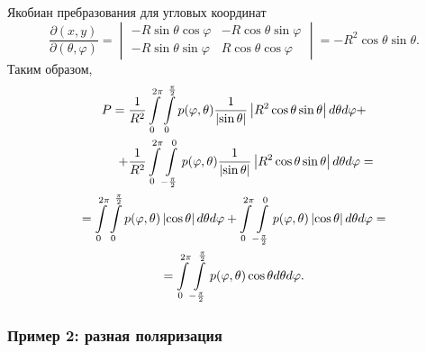 Якобиан пребразования для угловых координат
\[
    \frac{\partial (x, y)}{\partial (\theta, \varphi)}
    = \begin{vmatrix}
          - R \sin \theta \cos \varphi & - R \cos \theta \sin \varphi \\
          - R \sin \theta \sin \varphi & R \cos \theta \cos \varphi
    \end{vmatrix}
    = - R^2 \cos \theta \sin \theta .
\]
Таким образом,
\begin{multline*}
    P = \frac{1}{R^2} \int \limits_0^{2 \pi} \int \limits_0^\frac{\pi}{2} p(\varphi, \theta) \frac{1}{\modulus{\sin \theta}} \modulus{R^2 \cos \theta \sin \theta} d\theta d\varphi + \\
    \shoveright{+ \frac{1}{R^2} \int \limits_0^{2 \pi} \int \limits_{-\frac{\pi}{2}}^0 p(\varphi, \theta) \frac{1}{\modulus{\sin \theta}} \modulus{R^2 \cos \theta \sin \theta} d\theta d\varphi = } \\
    = \int \limits_0^{2 \pi} \int \limits_0^\frac{\pi}{2} p(\varphi, \theta) \modulus{\cos \theta} d\theta d\varphi
    + \int \limits_0^{2 \pi} \int \limits_{-\frac{\pi}{2}}^0 p(\varphi, \theta) \modulus{\cos \theta} d\theta d\varphi = \\
    = \int \limits_0^{2 \pi} \int \limits_{-\frac{\pi}{2}}^\frac{\pi}{2} p(\varphi, \theta) \cos \theta d\theta d\varphi .
\end{multline*}

\subsubsection{Пример 2: разная поляризация}

